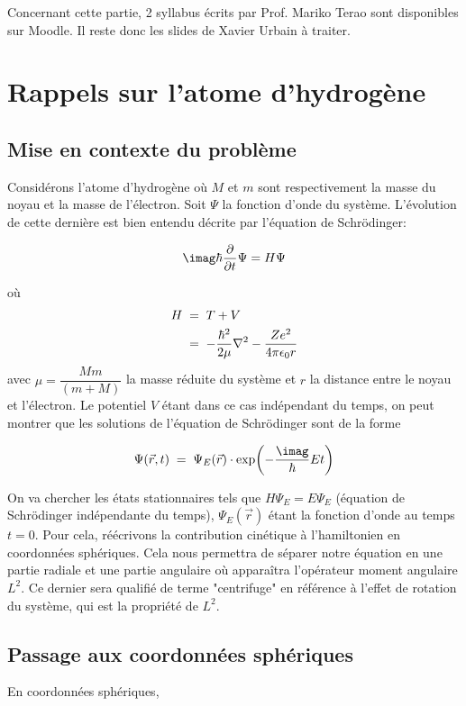 Concernant cette partie, 2 syllabus écrits par Prof. Mariko Terao sont disponibles sur Moodle. Il reste donc les slides de Xavier Urbain à traiter.

\section{Rappels sur l'atome d'hydrogène}

\subsection{Mise en contexte du problème}

Considérons l'atome d'hydrogène où $M$ et $m$ sont respectivement la masse du noyau et la masse de l'électron. Soit $\Psi$ la fonction d'onde du système. L'évolution de cette dernière est bien entendu décrite par l'équation de Schrödinger:

\[\imag\hbar \dfrac{\partial}{\partial t}\Psi=H\Psi\]

où \begin{align}
H&\; = \; T+V \\
&\; = \; -\dfrac{\hbar^2}{2\mu}\nabla^2-\dfrac{Ze^2}{4\pi \epsilon_0 r}
\end{align}
avec $\mu=\dfrac{Mm}{(m+M)}$ la masse réduite du système et $r$ la distance entre le noyau et l'électron. Le potentiel $V$ étant dans ce cas indépendant du temps, on peut montrer que les solutions de l'équation de Schrödinger sont de la forme

\[
    \Psi(\Vec{r},t) \eq \Psi_E(\Vec{r}) \cdot \exp(-\dfrac{\imag}{\hbar}Et)
\]


On va chercher les états stationnaires tels que $H\Psi_E=E\Psi_E$ (équation de Schrödinger indépendante du temps), $\Psi_E(\Vec{r})$ étant la fonction d'onde au temps $t=0$. Pour cela, réécrivons la contribution cinétique à l'hamiltonien en coordonnées sphériques. Cela nous permettra de séparer notre équation en une partie radiale et une partie angulaire où apparaîtra l'opérateur moment angulaire $L^2$. Ce dernier sera qualifié de terme "centrifuge" en référence à l'effet de rotation du système, qui est la propriété de $L^2$. 

\subsection{Passage aux coordonnées sphériques}

En coordonnées sphériques, 

